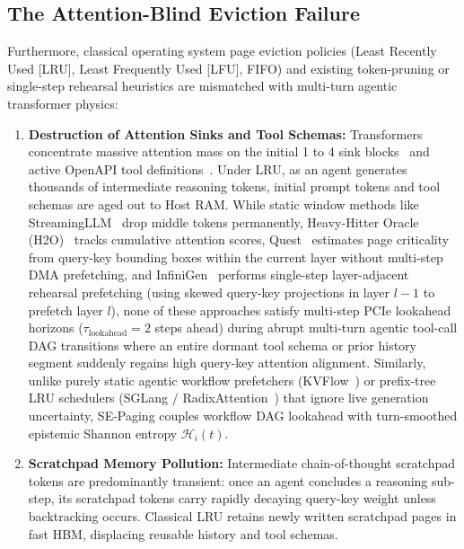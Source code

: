 \documentclass[conference,10pt]{IEEEtran}
\begin{document}
\subsection{The Attention-Blind Eviction Failure}
Furthermore, classical operating system page eviction policies (Least Recently Used [LRU], Least Frequently Used [LFU], FIFO) and existing token-pruning or single-step rehearsal heuristics are mismatched with multi-turn agentic transformer physics:
\begin{enumerate}
    \item \textbf{Destruction of Attention Sinks and Tool Schemas:} Transformers concentrate massive attention mass on the initial 1 to 4 sink blocks~\cite{xiao2023efficient} and active OpenAPI tool definitions~\cite{patil2024gorilla}. Under LRU, as an agent generates thousands of intermediate reasoning tokens, initial prompt tokens and tool schemas are aged out to Host RAM. While static window methods like StreamingLLM~\cite{xiao2023efficient} drop middle tokens permanently, Heavy-Hitter Oracle (H2O)~\cite{zhang2023h2o} tracks cumulative attention scores, Quest~\cite{tang2024quest} estimates page criticality from query-key bounding boxes within the current layer without multi-step DMA prefetching, and InfiniGen~\cite{lee2024infinigen} performs single-step layer-adjacent rehearsal prefetching (using skewed query-key projections in layer $l-1$ to prefetch layer $l$), none of these approaches satisfy multi-step PCIe lookahead horizons ($\tau_{\text{lookahead}} = 2$ steps ahead) during abrupt multi-turn agentic tool-call DAG transitions where an entire dormant tool schema or prior history segment suddenly regains high query-key attention alignment. Similarly, unlike purely static agentic workflow prefetchers (KVFlow~\cite{pan2025kvflow}) or prefix-tree LRU schedulers (SGLang / RadixAttention~\cite{zheng2024sglang}) that ignore live generation uncertainty, SE-Paging couples workflow DAG lookahead with turn-smoothed epistemic Shannon entropy $\mathcal{H}_i(t)$.
    \item \textbf{Scratchpad Memory Pollution:} Intermediate chain-of-thought scratchpad tokens are predominantly transient: once an agent concludes a reasoning sub-step, its scratchpad tokens carry rapidly decaying query-key weight unless backtracking occurs. Classical LRU retains newly written scratchpad pages in fast HBM, displacing reusable history and tool schemas.
\end{enumerate}
\end{document}

